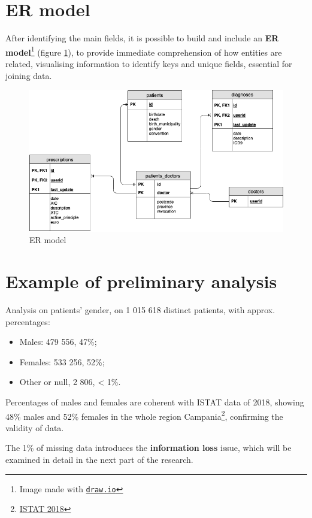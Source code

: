 \section{ER model}
After identifying the main fields, it is possible to build and include an \textbf{ER model}\footnote{Image made with \texttt{\href{draw.io}{draw.io}}} (figure \ref{er}), to provide immediate comprehension of how entities are related, visualising information to identify keys and unique fields, essential for joining data.
\smallskip
\begin{figure}[h]
	\centering
	\includegraphics[scale=0.58]{images/er.png}
	\caption{\small ER model}
	\label{er}
\end{figure}

\section[Preliminary analysis]{Example of preliminary analysis}
Analysis on patients' gender, on 1 015 618 distinct patients, with approx. percentages:
\begin{itemize}
	\item Males: 479 556, 47\%;
	\item Females: 533 256, 52\%;
	\item Other or null, 2 806,  < 1\%.
\end{itemize}

Percentages of males and females are coherent with ISTAT data of 2018, showing 48\% males and 52\% females in the whole region Campania\footnote{\href{http://demo.istat.it/bil2018/index.html}{ISTAT 2018}}, confirming the validity of data.

The 1\% of missing data introduces the \textbf{information loss} issue, which will be examined in detail in the next part of the research.

